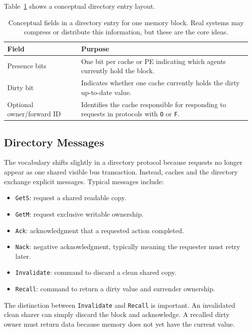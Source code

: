 Table~\ref{tab:mp-directory-entry} shows a conceptual directory entry layout.
\begin{table}[t]
    \centering
    \small
    \renewcommand{\arraystretch}{1.15}
    \begin{tabular}{|>{\raggedright\arraybackslash}p{1.35in}|>{\raggedright\arraybackslash}p{4.00in}|}
        \hline
        Field                     & Purpose                                                                                                 \\
        \hline
        Presence bits             & One bit per cache or PE indicating which agents currently hold the block.                               \\
        \hline
        Dirty bit                 & Indicates whether one cache currently holds the dirty up-to-date value.                                 \\
        \hline
        Optional owner/forward ID & Identifies the cache responsible for responding to requests in protocols with \texttt{O} or \texttt{F}. \\
        \hline
    \end{tabular}
    \caption{Conceptual fields in a directory entry for one memory block. Real systems may compress or distribute this information, but these are the core ideas.}
    \label{tab:mp-directory-entry}
\end{table}

\subsection*{Directory Messages}
The vocabulary shifts slightly in a directory protocol because requests no longer appear as one shared visible bus transaction.
Instead, caches and the directory exchange explicit messages.
Typical messages include:
\begin{itemize}
    \item \texttt{GetS}: request a shared readable copy.
    \item \texttt{GetM}: request exclusive writable ownership.
    \item \texttt{Ack}: acknowledgment that a requested action completed.
    \item \texttt{Nack}: negative acknowledgment, typically meaning the requester must retry later.
    \item \texttt{Invalidate}: command to discard a clean shared copy.
    \item \texttt{Recall}: command to return a dirty value and surrender ownership.
\end{itemize}
The distinction between \texttt{Invalidate} and \texttt{Recall} is important.
An invalidated clean sharer can simply discard the block and acknowledge.
A recalled dirty owner must return data because memory does not yet have the current value.


